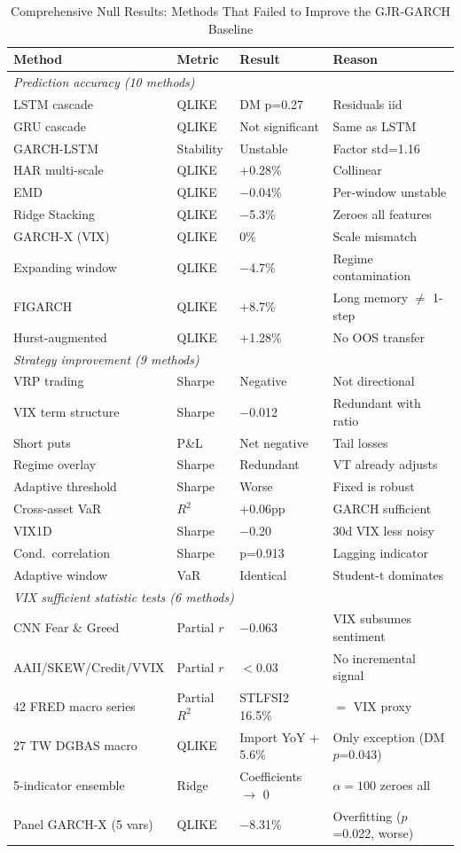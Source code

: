 \begin{table}[H]
\centering
\caption{Comprehensive Null Results: Methods That Failed to Improve the GJR-GARCH Baseline}
\label{tab:nulls}
\footnotesize
\begin{tabular}{llll}
\toprule
Method & Metric & Result & Reason \\
\midrule
\multicolumn{4}{l}{\textit{Prediction accuracy (10 methods)}} \\
LSTM cascade & QLIKE & DM p=0.27 & Residuals iid \\
GRU cascade & QLIKE & Not significant & Same as LSTM \\
GARCH-LSTM & Stability & Unstable & Factor std=1.16 \\
HAR multi-scale & QLIKE & +0.28\% & Collinear \\
EMD & QLIKE & $-$0.04\% & Per-window unstable \\
Ridge Stacking & QLIKE & $-$5.3\% & Zeroes all features \\
GARCH-X (VIX) & QLIKE & 0\% & Scale mismatch \\
Expanding window & QLIKE & $-$4.7\% & Regime contamination \\
FIGARCH & QLIKE & +8.7\% & Long memory $\neq$ 1-step \\
Hurst-augmented & QLIKE & +1.28\% & No OOS transfer \\
\midrule
\multicolumn{4}{l}{\textit{Strategy improvement (9 methods)}} \\
VRP trading & Sharpe & Negative & Not directional \\
VIX term structure & Sharpe & $-$0.012 & Redundant with ratio \\
Short puts & P\&L & Net negative & Tail losses \\
Regime overlay & Sharpe & Redundant & VT already adjusts \\
Adaptive threshold & Sharpe & Worse & Fixed is robust \\
Cross-asset VaR & $R^2$ & +0.06pp & GARCH sufficient \\
VIX1D & Sharpe & $-$0.20 & 30d VIX less noisy \\
Cond.\ correlation & Sharpe & p=0.913 & Lagging indicator \\
Adaptive window & VaR & Identical & Student-t dominates \\
\midrule
\multicolumn{4}{l}{\textit{VIX sufficient statistic tests (6 methods)}} \\
CNN Fear \& Greed & Partial $r$ & $-$0.063 & VIX subsumes sentiment \\
AAII/SKEW/Credit/VVIX & Partial $r$ & $<$0.03 & No incremental signal \\
42 FRED macro series & Partial $R^2$ & STLFSI2 16.5\% & $=$ VIX proxy \\
27 TW DGBAS macro & QLIKE & Import YoY $+$5.6\% & Only exception (DM $p$=0.043) \\
5-indicator ensemble & Ridge & Coefficients $\to$ 0 & $\alpha=100$ zeroes all \\
Panel GARCH-X (5 vars) & QLIKE & $-$8.31\% & Overfitting ($p$=0.022, worse) \\
\bottomrule
\end{tabular}
\end{table}
